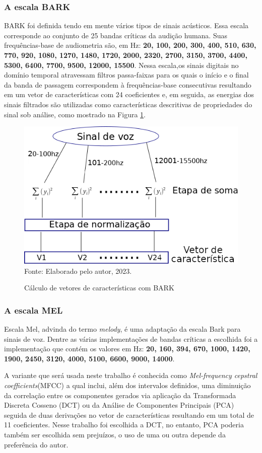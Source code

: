 		\subsubsection{A escala BARK}
			\par BARK foi definida tendo em mente vários tipos de sinais acústicos. Essa escala corresponde ao conjunto de 25 bandas críticas da audição humana. Suas frequências-base de audiometria são, em Hz: \textbf{20, 100, 200, 300, 400, 510, 630, 770, 920, 1080, 1270, 1480, 1720, 2000, 2320, 2700, 3150, 3700, 4400, 5300, 6400, 7700, 9500, 12000, 15500}. Nessa escala,os sinais digitais no domínio temporal atravessam filtros passa-faixas \cite{bosi2002introduction} para os quais o início e o final da banda de passagem correspondem à frequências-base consecutivas resultando em um vetor de características com 24 coeficientes e, em seguida, as energias dos sinais filtrados são utilizadas como características descritivas de propriedades do sinal sob análise, como mostrado na Figura \ref{fig:barkfeaturevect}.
			\begin{figure}[h]
				\centering
				\caption{Cálculo de vetores de características com BARK}
				\includegraphics[width=0.6\linewidth]{images/barkFeatureVect}
				\label{fig:barkfeaturevect}
				\\Fonte: Elaborado pelo autor, 2023.
			\end{figure}
		\subsubsection{A escala MEL}
			\par Escala Mel, advinda do termo \textit{melody}, é uma adaptação da escala Bark para sinais de voz. Dentre as várias implementações de bandas críticas a escolhida foi a implementação que contém os valores em Hz: \textbf{20, 160, 394, 670, 1000, 1420, 1900, 2450, 3120, 4000, 5100, 6600, 9000, 14000}.
			
			\par A variante que será usada neste trabalho é conhecida como \textit{Mel-frequency cepstral coefficients}(MFCC) a qual inclui, além dos intervalos definidos, uma diminuição da correlação entre os componentes gerados via aplicação da Transformada Discreta Cosseno (DCT) \cite{salomon2007data} ou da Análise de Componentes Principais (PCA) \cite{jolliffe2006principal} seguida de duas derivações no vetor de características resultando em um total de 11 coeficientes. Nesse trabalho foi escolhida a DCT, no entanto, PCA poderia também ser escolhida sem prejuízos, o uso de uma ou outra depende da preferência do autor.
			
